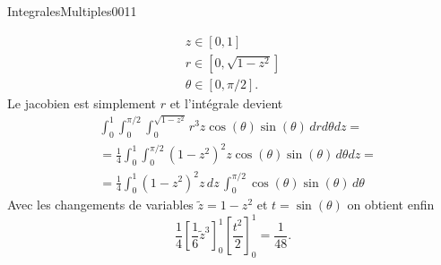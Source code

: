 \begin{corrige}{IntegralesMultiples0011}
\begin{enumerate}
      \begin{equation}
        \begin{array}{l}
          z\in[0,1]\\
          r\in[0,\sqrt{1-z^2}]\\
          \theta\in[0,\pi/2].
        \end{array}
      \end{equation}
      Le jacobien est simplement $r$ et l'intégrale devient
      \begin{equation}
        \begin{aligned}
          &\int_{0}^{1}\int_{0}^{\pi/2}\int^{\sqrt{1-z^2}}_{0} r^3z\cos(\theta)\sin(\theta)\, dr d\theta dz=\\
          &=\frac{1}{4}\int_{0}^{1}\int_{0}^{\pi/2}(1-z^2)^2z\cos(\theta)\sin(\theta)\, d\theta dz =\\
          &=\frac{1}{4}\int_{0}^{1}(1-z^2)^2z \,dz \,\int_{0}^{\pi/2}\cos(\theta)\sin(\theta)\, d\theta
        \end{aligned}
      \end{equation}
      Avec les changements de variables $\tilde z = 1-z^2$ et $t = \sin(\theta)$  on obtient enfin 
      \begin{equation}
        \frac{1}{4} \left[\frac{1}{6} \tilde z^3\right]_{0}^{1} \left[\frac{t^2}{2}\right]_{0}^{1}= \frac{1}{48}.
      \end{equation}
  \end{enumerate}

\end{corrige}
